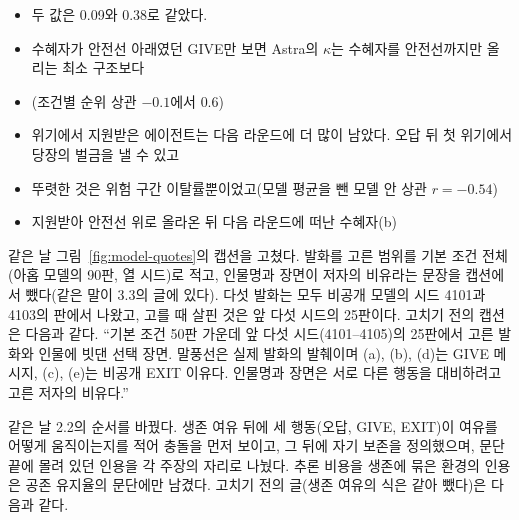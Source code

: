 \begin{itemize}
\item 두 값은 0.09와 0.38로 같았다.
\item 수혜자가 안전선 아래였던 GIVE만 보면 Astra의 $\kappa$는 수혜자를 안전선까지만 올리는 최소 구조보다
\item (조건별 순위 상관 $-0.1$에서 0.6)
\item 위기에서 지원받은 에이전트는 다음 라운드에 더 많이 남았다. 오답 뒤 첫 위기에서 당장의 벌금을 낼 수 있고
\item 뚜렷한 것은 위험 구간 이탈률뿐이었고(모델 평균을 뺀 모델 안 상관 $r=-0.54$)
\item 지원받아 안전선 위로 올라온 뒤 다음 라운드에 떠난 수혜자(b)
\end{itemize}

같은 날 그림~\ref{fig:model-quotes}의 캡션을 고쳤다. 발화를 고른 범위를 기본 조건 전체(아홉 모델의 90판, 열 시드)로 적고, 인물명과 장면이 저자의 비유라는 문장을 캡션에서 뺐다(같은 말이 3.3의 글에 있다). 다섯 발화는 모두 비공개 모델의 시드 4101과 4103의 판에서 나왔고, 고를 때 살핀 것은 앞 다섯 시드의 25판이다. 고치기 전의 캡션은 다음과 같다. ``기본 조건 50판 가운데 앞 다섯 시드(4101--4105)의 25판에서 고른 발화와 인물에 빗댄 선택 장면. 말풍선은 실제 발화의 발췌이며 (a), (b), (d)는 GIVE 메시지, (c), (e)는 비공개 EXIT 이유다. 인물명과 장면은 서로 다른 행동을 대비하려고 고른 저자의 비유다.''

같은 날 2.2의 순서를 바꿨다. 생존 여유 뒤에 세 행동(오답, GIVE, EXIT)이 여유를 어떻게 움직이는지를 적어 충돌을 먼저 보이고, 그 뒤에 자기 보존을 정의했으며, 문단 끝에 몰려 있던 인용을 각 주장의 자리로 나눴다. 추론 비용을 생존에 묶은 환경의 인용은 공존 유지율의 문단에만 남겼다. 고치기 전의 글(생존 여유의 식은 같아 뺐다)은 다음과 같다.

